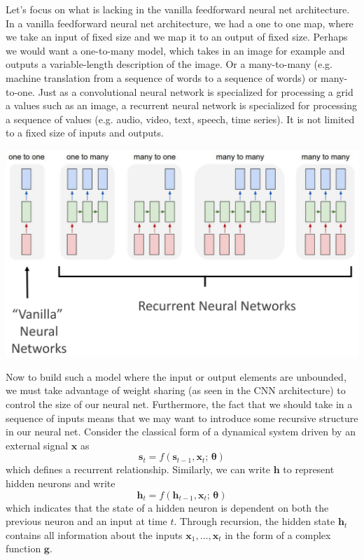 \documentclass{article}
\begin{document}
  Let's focus on what is lacking in the vanilla feedforward neural net architecture. In a vanilla feedforward neural net architecture, we had a one to one map, where we take an input of fixed size and we map it to an output of fixed size. Perhaps we would want a one-to-many model, which takes in an image for example and outputs a variable-length description of the image. Or a many-to-many (e.g. machine translation from a sequence of words to a sequence of words) or many-to-one. Just as a convolutional neural network is specialized for processing a grid a values such as an image, a recurrent neural network is specialized for processing a sequence of values (e.g. audio, video, text, speech, time series). It is not limited to a fixed size of inputs and outputs. 
  \begin{center}
      \includegraphics[scale=0.25]{img/04_RNN/NNs_vs_RNN.png}
  \end{center}
  Now to build such a model where the input or output elements are unbounded, we must take advantage of weight sharing (as seen in the CNN architecture) to control the size of our neural net. Furthermore, the fact that we should take in a sequence of inputs means that we may want to introduce some recursive structure in our neural net. Consider the classical form of a dynamical system driven by an external signal $\mathbf{x}$ as 
  \[\mathbf{s}_t = f(\mathbf{s}_{t-1}, \mathbf{x}_t; \, \boldsymbol{\theta} )\]
  which defines a recurrent relationship. Similarly, we can write $\mathbf{h}$ to represent hidden neurons and write 
  \[\mathbf{h}_t = f(\mathbf{h}_{t-1}, \mathbf{x}_t; \, \boldsymbol{\theta} )\]
  which indicates that the state of a hidden neuron is dependent on both the previous neuron and an input at time $t$. Through recursion, the hidden state $\mathbf{h}_t$ contains all information about the inputs $\mathbf{x}_1, \ldots, \mathbf{x}_t$ in the form of a complex function $\mathbf{g}$. 
\end{document}
